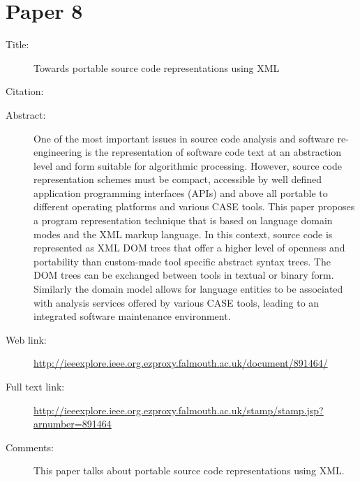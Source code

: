 \documentclass{scrartcl}
\begin{document}
\section*{Paper 8}
\begin{description}
\item[Title:] Towards portable source code representations using XML
\item[Citation:] \cite{891464}
\item[Abstract:] One of the most important issues in source code analysis and software re-engineering is the representation of software code text at an abstraction level and form suitable for algorithmic processing. However, source code representation schemes must be compact, accessible by well defined application programming interfaces (APIs) and above all portable to different operating platforms and various CASE tools. This paper proposes a program representation technique that is based on language domain modes and the XML markup language. In this context, source code is represented as XML DOM trees that offer a higher level of openness and portability than custom-made tool specific abstract syntax trees. The DOM trees can be exchanged between tools in textual or binary form. Similarly the domain model allows for language entities to be associated with analysis services offered by various CASE tools, leading to an integrated software maintenance environment.
\item[Web link:] \url{http://ieeexplore.ieee.org.ezproxy.falmouth.ac.uk/document/891464/}
\item[Full text link:] \url{http://ieeexplore.ieee.org.ezproxy.falmouth.ac.uk/stamp/stamp.jsp?arnumber=891464}
\item[Comments:] This paper talks about portable source code representations using XML. 
\end{description}
\end{document}
